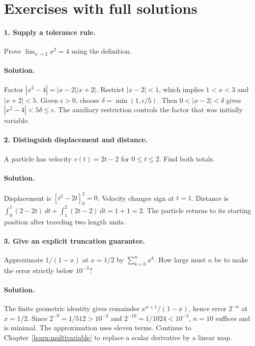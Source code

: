 \section{Exercises with full solutions}
\paragraph{1. Supply a tolerance rule.}
Prove $\lim_{x\to2}x^2=4$ using the definition.

\paragraph{Solution.}
Factor $|x^2-4|=|x-2||x+2|$. Restrict $|x-2|<1$, which implies
$1<x<3$ and $|x+2|<5$. Given $\epsilon>0$, choose
$\delta=\min(1,\epsilon/5)$. Then $0<|x-2|<\delta$ gives
$|x^2-4|<5\delta\leq\epsilon$. The auxiliary restriction controls
the factor that was initially variable.

\paragraph{2. Distinguish displacement and distance.}
A particle has velocity $v(t)=2t-2$ for $0\leq t\leq2$. Find both totals.

\paragraph{Solution.}
Displacement is $[t^2-2t]_0^2=0$. Velocity changes sign at $t=1$.
Distance is $\int_0^1(2-2t)\,dt+\int_1^2(2t-2)\,dt=1+1=2$.
The particle returns to its starting position after traveling two length units.

\paragraph{3. Give an explicit truncation guarantee.}
Approximate $1/(1-x)$ at $x=1/2$ by $\sum_{k=0}^n x^k$. How large
must $n$ be to make the error strictly below $10^{-3}$?

\paragraph{Solution.}
The finite geometric identity gives remainder $x^{n+1}/(1-x)$, hence error
$2^{-n}$ at $x=1/2$. Since $2^{-9}=1/512>10^{-3}$ and
$2^{-10}=1/1024<10^{-3}$, $n=10$ suffices and is minimal.
The approximation uses eleven terms. Continue to
Chapter~\ref{learn:multivariable} to replace a scalar derivative by a linear map.


